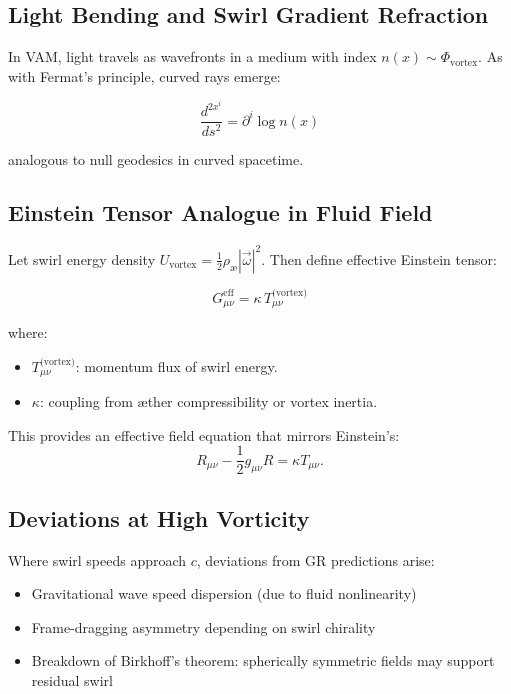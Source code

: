 \documentclass[12pt]{article}
\begin{document}
    \subsection*{Light Bending and Swirl Gradient Refraction}

    In VAM, light travels as wavefronts in a medium with index \( n(x) \sim \Phi_{\text{vortex}} \). As with Fermat’s principle, curved rays emerge:
    \begin{eqbox}
        \begin{equation}
            \frac{d^{2x^i}}{ds^2} = \partial^i \log n(x)
        \end{equation}
    \end{eqbox}

    analogous to null geodesics in curved spacetime.

    \subsection*{Einstein Tensor Analogue in Fluid Field}

    Let swirl energy density \( U_{\text{vortex}} = \frac{1}{2} \rho_{\text{\ae}} |\vec{\omega}|^2 \). Then define effective Einstein tensor:
    \begin{eqbox}
        \begin{equation}
            G_{\mu\nu}^{\text{eff}} = \kappa \, T_{\mu\nu}^{\text{(vortex)}}
        \end{equation}
    \end{eqbox}

    where:
    \begin{itemize}
        \item \( T_{\mu\nu}^{\text{(vortex)}} \): momentum flux of swirl energy.
        \item \( \kappa \): coupling from æther compressibility or vortex inertia.
    \end{itemize}

    This provides an effective field equation that mirrors Einstein's:
    \[
        R_{\mu\nu} - \frac{1}{2}g_{\mu\nu}R = \kappa T_{\mu\nu}.
    \]



    \subsection*{Deviations at High Vorticity}

    Where swirl speeds approach \( c \), deviations from GR predictions arise:
    \begin{itemize}
        \item Gravitational wave speed dispersion (due to fluid nonlinearity)
        \item Frame-dragging asymmetry depending on swirl chirality
        \item Breakdown of Birkhoff’s theorem: spherically symmetric fields may support residual swirl
    \end{itemize}
\end{document}
